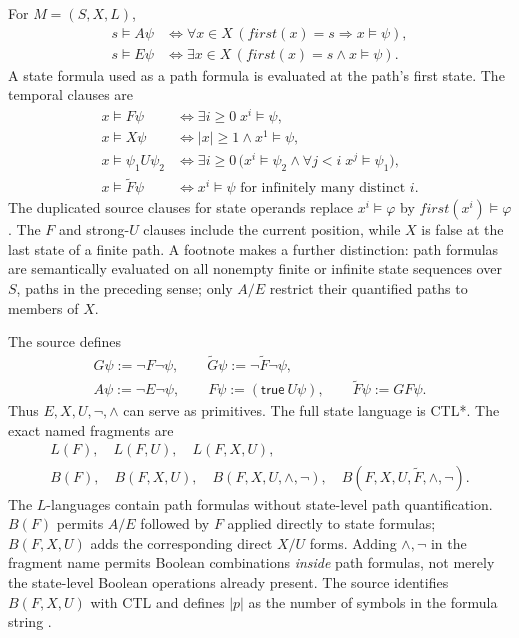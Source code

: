 For \(M=(S,X,L)\),
\[
\begin{aligned}
 s\models A\psi
 &\Longleftrightarrow
   \forall x\in X\,
   (first(x)=s\Rightarrow x\models\psi),\\
 s\models E\psi
 &\Longleftrightarrow
   \exists x\in X\,
   (first(x)=s\land x\models\psi).
\end{aligned}
\]
A state formula used as a path formula is evaluated at the path's first
state.  The temporal clauses are
\[
\begin{aligned}
 x\models F\psi
 &\Longleftrightarrow
   \exists i\geq0\;x^i\models\psi,\\
 x\models X\psi
 &\Longleftrightarrow
   |x|\geq1\land x^1\models\psi,\\
 x\models\psi_1U\psi_2
 &\Longleftrightarrow
   \exists i\geq0\,
   \bigl(x^i\models\psi_2
     \land\forall j<i\;x^j\models\psi_1\bigr),\\
 x\models\widetilde F\psi
 &\Longleftrightarrow
   \text{\(x^i\models\psi\) for infinitely many distinct \(i\)}.
\end{aligned}
\]
The duplicated source clauses for state operands replace
\(x^i\models\varphi\) by \(first(x^i)\models\varphi\).
The \(F\) and strong-\(U\) clauses include the current position, while \(X\)
is false at the last state of a finite path.  A footnote makes a further
distinction: path formulas are semantically evaluated on all nonempty finite
or infinite state sequences over \(S\), paths in the preceding sense; only
\(A/E\) restrict their quantified paths to members of \(X\).

The source defines
\[
\begin{gathered}
 G\psi:=\neg F\neg\psi,\qquad
 \widetilde G\psi:=\neg\widetilde F\neg\psi,\\
 A\psi:=\neg E\neg\psi,\qquad
 F\psi:=(\mathsf{true}\ U\psi),\qquad
 \widetilde F\psi:=GF\psi.
\end{gathered}
\]
Thus \(E,X,U,\neg,\land\) can serve as primitives.  The full state language
is CTL*.  The exact named fragments are
\[
\begin{gathered}
 L(F),\quad L(F,U),\quad L(F,X,U),\\
 B(F),\quad B(F,X,U),\quad
 B(F,X,U,\land,\neg),\quad
 B(F,X,U,\widetilde F,\land,\neg).
\end{gathered}
\]
The \(L\)-languages contain path formulas without state-level path
quantification.  \(B(F)\) permits \(A/E\) followed by \(F\) applied directly
to state formulas; \(B(F,X,U)\) adds the corresponding direct \(X/U\)
forms.  Adding \(\land,\neg\) in the fragment name permits Boolean
combinations \emph{inside} path formulas, not merely the state-level Boolean
operations already present.  The source identifies \(B(F,X,U)\) with CTL
and defines \(|p|\) as the number of symbols in the formula string
\cite[pp.~156--158]{EmersonHalpern1986}.

